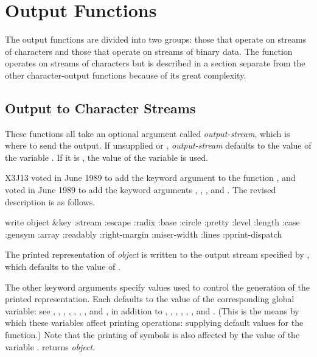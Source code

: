 \section {Output Functions}

The output functions are divided into two groups: those that
operate on streams of characters and those that operate on
streams of binary data.  The function  operates
on streams of characters but is described in a section
separate from the other character-output functions
because of its great complexity.

\subsection {Output to Character Streams}

These functions all take an optional argument called \emph{output-stream},
which is where to send the output.  If unsupplied or {\false}, \emph{output-stream}
defaults to the value of the variable
.  If it is {\true}, the value of the variable
 is used.

X3J13 voted in June 1989  to add the keyword argument
 to the function , and voted in June 1989 
to add the keyword arguments , , ,
and .
The revised description
is as follows.

\begin{defun}[Function]
write object &key :stream :escape :radix :base :circle
   :pretty :level :length :case :gensym :array :readably
   :right-margin :miser-width :lines :pprint-dispatch

The printed representation of \emph{object} is written to the output stream
specified by , which defaults to the value of .

The other keyword arguments specify values used to control the
generation of the printed representation.  Each defaults to the
value of the corresponding global variable: see ,
, , , ,
, , and , in addition to
,
,
,
,
,
,
and .
(This is the means by which these variables affect printing operations:
supplying default values for the  function.)
Note that the printing of symbols is also affected by the value
of the variable .
 returns \emph{object}.
\end{defun}

